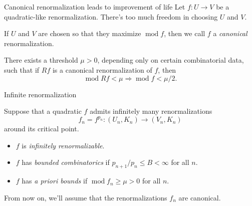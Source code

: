 \documentclass{beamer}
\DeclareMathOperator{\modulus}{mod}
\begin{document}
\begin{frame}{Canonical renormalization leads to improvement of life}
Let $f:U\rightarrow V$ be a quadratic-like renormalization. There's too much freedom in choosing $U$ and $V$.
\begin{definition}
If $U$ and $V$ are chosen so that they maximize $\modulus f$, then we call $f$ a \textit{canonical} renormalization.
\end{definition}

\begin{theorem}
There exists a threshold $\mu>0$, depending only on certain combinatorial data, such that if $Rf$ is a canonical renormalization of $f$, then \[\modulus Rf<\mu \Rightarrow \modulus f < \mu/2.\]
\end{theorem}
\end{frame}

\begin{frame}{Infinite renormalization}
\begin{definition}
Suppose that a quadratic $f$ admits infinitely many renormalizations \[f_n=f^{p_n}:(U_n, K_n)\rightarrow (V_n, K_n)\] around its critical point.
\begin{itemize}
    \item $f$ is \textit{infinitely renormalizable}.
    \item $f$ has \emph{bounded combinatorics} if $p_{n+1}/p_n\leq B<\infty$ for all $n$.
    \item $f$ has \emph{a priori bounds} if $\modulus f_n\geq \mu>0$ for all $n$.
\end{itemize}
\end{definition}
From now on, we'll assume that the renormalizations $f_n$ are canonical.
\end{frame}
\end{document}
